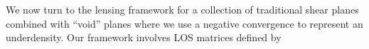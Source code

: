We now turn to the lensing framework for a collection of traditional shear planes combined with ``void'' planes where we use a negative convergence to represent an underdensity.  Our framework involves LOS matrices defined by